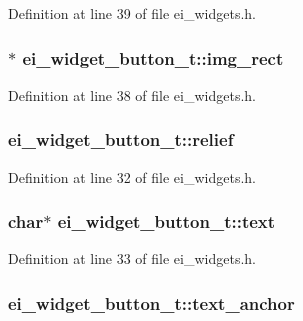 Definition at line 39 of file ei\-\_\-widgets.\-h.

\hypertarget{structei__widget__button__t_aa41be279677fbc141d0e7a8041afd936}{
\subsubsection[{img\-\_\-rect}]{$\ast$ ei\-\_\-widget\-\_\-button\-\_\-t\-::img\-\_\-rect}}\label{structei__widget__button__t_aa41be279677fbc141d0e7a8041afd936}


Definition at line 38 of file ei\-\_\-widgets.\-h.

\hypertarget{structei__widget__button__t_a96c4fa4a563064cc4cb67066fbbddc2b}{
\subsubsection[{relief}]{ ei\-\_\-widget\-\_\-button\-\_\-t\-::relief}}\label{structei__widget__button__t_a96c4fa4a563064cc4cb67066fbbddc2b}


Definition at line 32 of file ei\-\_\-widgets.\-h.

\hypertarget{structei__widget__button__t_a3baa34b73437e99f2f0e162351a3ba84}{
\subsubsection[{text}]{\setlength{\rightskip}{0pt plus 5cm}char$\ast$ ei\-\_\-widget\-\_\-button\-\_\-t\-::text}}\label{structei__widget__button__t_a3baa34b73437e99f2f0e162351a3ba84}


Definition at line 33 of file ei\-\_\-widgets.\-h.

\hypertarget{structei__widget__button__t_a2897e23a54ab047beb6203d835191e8e}{
\subsubsection[{text\-\_\-anchor}]{ ei\-\_\-widget\-\_\-button\-\_\-t\-::text\-\_\-anchor}}\label{structei__widget__button__t_a2897e23a54ab047beb6203d835191e8e}


